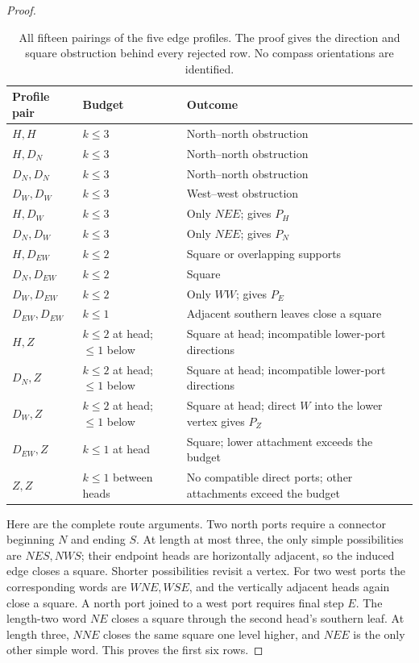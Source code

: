 \begin{proof}
\begin{table}[!htbp]
\centering
\small
\begin{tabularx}{\linewidth}{@{}l l X@{}}
\toprule
Profile pair & Budget & Outcome\\
\midrule
\(H,H\) & \(k\le3\) & North--north obstruction\\
\(H,D_N\) & \(k\le3\) & North--north obstruction\\
\(D_N,D_N\) & \(k\le3\) & North--north obstruction\\
\(D_W,D_W\) & \(k\le3\) & West--west obstruction\\
\(H,D_W\) & \(k\le3\) & Only \(NEE\); gives \(P_H\)\\
\(D_N,D_W\) & \(k\le3\) & Only \(NEE\); gives \(P_N\)\\
\(H,D_{EW}\) & \(k\le2\) & Square or overlapping supports\\
\(D_N,D_{EW}\) & \(k\le2\) & Square\\
\(D_W,D_{EW}\) & \(k\le2\) & Only \(WW\); gives \(P_E\)\\
\(D_{EW},D_{EW}\) & \(k\le1\) & Adjacent southern leaves close a square\\
\(H,Z\) & \(k\le2\) at head; \(\le1\) below &
Square at head; incompatible lower-port directions\\
\(D_N,Z\) & \(k\le2\) at head; \(\le1\) below &
Square at head; incompatible lower-port directions\\
\(D_W,Z\) & \(k\le2\) at head; \(\le1\) below &
Square at head; direct \(W\) into the lower vertex gives \(P_Z\)\\
\(D_{EW},Z\) & \(k\le1\) at head &
Square; lower attachment exceeds the budget\\
\(Z,Z\) & \(k\le1\) between heads &
No compatible direct ports; other attachments exceed the budget\\
\bottomrule
\end{tabularx}
\caption{All fifteen pairings of the five edge profiles. The proof gives
the direction and square obstruction behind every rejected row. No
compass orientations are identified.}\label{t:pair-table}
\end{table}

Here are the complete route arguments. Two north ports require a
connector beginning \(N\) and ending \(S\). At length at most three,
the only simple possibilities are \(NES,NWS\); their endpoint heads
are horizontally adjacent, so the induced edge closes a square.
Shorter possibilities revisit a vertex. For two west ports the
corresponding words are \(WNE,WSE\), and the vertically adjacent
heads again close a square. A north port joined to a west port
requires final step \(E\). The length-two word \(NE\) closes a
square through the second head's southern leaf. At length three,
\(NNE\) closes the same square one level higher, and \(NEE\) is the
only other simple word. This proves the first six rows.


\end{proof}
